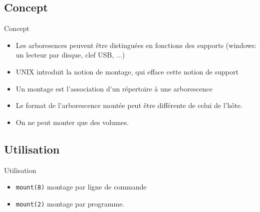 \subsection{\sectitle}
\begin{frame}[containsverbatim]{\sectitle}
\def\subsectitle{Concept}
\subsection{\subsectitle}
\begin{block}{\subsectitle}
\begin{itemize}
    \item Les arboresences peuvent être distinguées en fonctions des supports
        (windows: un lecteur par disque, clef USB, ...)
    \item UNIX introduit la notion de montage, qui efface cette notion de
        support
    \item Un montage est l'association d'un répertoire à une arborescence
    \item Le format de l'arborescence montée peut être différente de celui de
        l'hôte.
    \item On ne peut monter que des volumes.
\end{itemize}
\end{block}

\def\subsectitle{Utilisation}
\subsection{\subsectitle}
\begin{exampleblock}{\subsectitle}
    \begin{itemize}
        \item \verb+mount(8)+ montage par ligne de commande
        \item \verb+mount(2)+ montage par programme.
    \end{itemize}
\end{exampleblock}

\end{frame}



